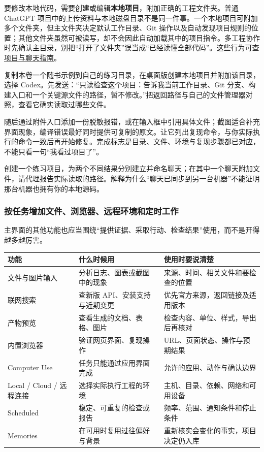 要修改本地代码，需要创建或编辑\textbf{本地项目}，附加正确的工程文件夹。普通 ChatGPT 项目中的上传资料与本地磁盘目录不是同一件事。一个本地项目可附加多个文件夹，但主文件夹决定默认工作目录、Git 操作以及自动发现项目规则的位置；其他文件夹虽然可被读写，却不会因此自动加载其中的项目指令。多工程协作时先确认主目录，别把“打开了文件夹”误当成“已经读懂全部代码”。这些行为可查\href{https://learn.chatgpt.com/docs/projects}{项目与聊天指南}。

\begin{example}[先证明代理看到了正确工程]
复制本卷一个随书示例到自己的练习目录，在桌面版创建本地项目并附加该目录，选择 Codex。先发送：“只读检查这个项目：告诉我当前工作目录、Git 分支、构建入口和一个关键源文件的路径，暂不修改。”把返回路径与自己的文件管理器对照，查看它确实读取过哪些文件。

随后通过附件入口添加一份脱敏报错，或在输入框中引用具体文件；截图适合补充界面现象，编译错误最好同时提供可复制的原文。让它列出复现命令，与你实际执行的命令一致后再开始修复。完成标志是目录、文件、环境与复现步骤都已对应，不能只看一句“我看过项目了”。
\end{example}

\begin{exercise}\label{ex:ai-desktop-project}
创建一个练习项目，为两个不同结果分别建立并命名聊天；在其中一个聊天附加文件，请代理报告实际读取的路径。解释为什么“聊天已同步到另一台机器”不能证明那台机器也拥有你的本地源码。
\end{exercise}

\subsubsection{按任务增加文件、浏览器、远程环境和定时工作}

主界面的其他功能也应当围绕“提供证据、采取行动、检查结果”使用，而不是开得越多越厉害。

\begin{center}
\begin{tabular}{p{}p{}p{}}
\toprule
功能 & 什么时候用 & 使用时要说清楚 \\
\midrule
文件与图片输入 & 分析日志、图表或截图中的现象 & 来源、时间、相关文件和要检查的位置 \\
联网搜索 & 查新版 API、安装支持与近期变更 & 优先官方来源，返回链接及适用版本 \\
产物预览 & 查看生成的文档、表格、图片 & 检查内容、单位、样式，导出后再核对 \\
内置浏览器 & 验证网页界面、复现操作 & URL、页面状态、操作与预期结果 \\
Computer Use & 任务只能通过应用界面完成 & 允许的应用、动作与确认边界 \\
Local / Cloud / 远程连接 & 选择实际执行工程的环境 & 主机、目录、依赖、网络和可用设备 \\
Scheduled & 稳定、可重复的检查或报告 & 频率、范围、通知条件和停止条件 \\
Memories & 在可用时复用过往偏好与背景 & 重新核实会变化的事实，项目决定仍入库 \\
\bottomrule
\end{tabular}
\end{center}

